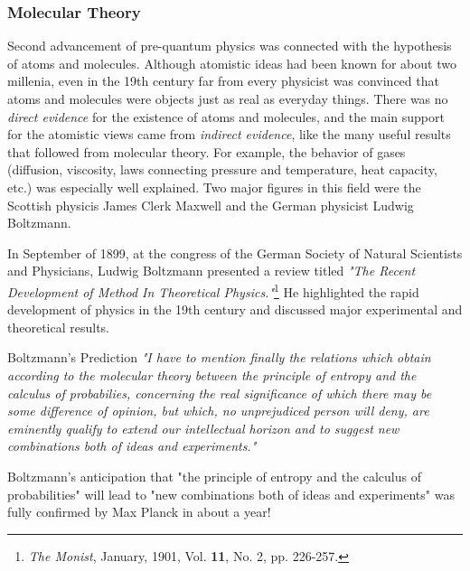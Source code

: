 \subsubsection*{Molecular Theory}
Second advancement of pre-quantum physics was connected with the hypothesis of atoms and molecules. Although atomistic ideas had been known for about two millenia, even in the 19th century far from every physicist was convinced that atoms and molecules were objects just as real as everyday things. There was no \emph{direct evidence} for the existence of atoms and molecules, and the main support for the atomistic views came from \emph{indirect evidence}, like the many useful results that followed from molecular theory. For example, the behavior of gases (diffusion, viscosity, laws connecting pressure and temperature, heat capacity, etc.) was especially well explained. Two major figures in this field were the Scottish physicis James Clerk Maxwell and the German physicist Ludwig Boltzmann.

In September of 1899, at the congress of the German Society of Natural Scientists and Physicians,  Ludwig Boltzmann presented a review titled \emph{"The Recent Development of Method In Theoretical Physics."}\footnote{\emph{The Monist}, January, 1901, Vol. {\bf 11}, No. 2, pp. 226-257.} He highlighted the rapid development of physics in the 19th century and discussed major experimental and theoretical results.

\begin{mybio}{Boltzmann's Prediction}
	\emph{"I have to mention finally the relations which obtain according to the molecular theory between the principle of entropy and the calculus of probabilies, concerning the real significance of which there may be some difference of opinion, but which, no unprejudiced person will deny, are eminently qualify to extend our intellectual horizon and to suggest new combinations both of ideas and experiments."}
\end{mybio}
Boltzmann's anticipation that "the principle of entropy and the calculus of probabilities" will lead to "new combinations both of ideas and experiments" was fully confirmed by Max Planck in about a year!


